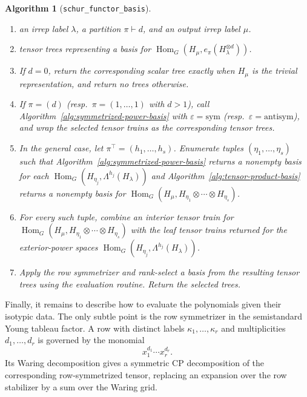 \documentclass[11pt]{article}
\newcommand{\HomG}[2]{\operatorname{Hom}_G\!\left(#1,#2\right)}
\newtheorem{algorithm}[theorem]{Algorithm}
\theoremstyle{definition}
\begin{document}
\begin{algorithm}[\texttt{schur\_functor\_basis}]\label{alg:schur-functor-basis}\label{alg:appendix-leaf-assembly}
  \phantom{}
  \begin{enumerate}[label=\textbf{Step \arabic*.},leftmargin=2.8cm]
    \item[\textbf{Input:}] an irrep label $\lambda$, a partition $\pi\vdash d$, and an output irrep label $\mu$.
    \item[\textbf{Output:}] tensor trees representing a basis for $\HomG{H_\mu}{e_\pi(H_\lambda^{\otimes d})}$.
    \item If $d=0$, return the corresponding scalar tree exactly when $H_\mu$ is the trivial representation, and return no trees otherwise.
    \item If $\pi=(d)$ (resp.~$\pi=(1,\dots,1)$ with $d>1$), call Algorithm~\ref{alg:symmetrized-power-basis} with $\varepsilon=\mathrm{sym}$ (resp.~$\varepsilon=\mathrm{antisym}$), and wrap the selected tensor trains as the corresponding tensor trees.
    \item In the general case, let $\pi^\top=(h_1,\dots,h_s)$.
    Enumerate tuples $(\eta_1,\dots,\eta_s)$ such that Algorithm~\ref{alg:symmetrized-power-basis} returns a nonempty basis for each $\HomG{H_{\eta_j}}{\Lambda^{h_j}(H_\lambda)}$ and Algorithm~\ref{alg:tensor-product-basis} returns a nonempty basis for $\HomG{H_\mu}{H_{\eta_1}\otimes\cdots\otimes H_{\eta_s}}$.
    \item For every such tuple, combine an interior tensor train for $\HomG{H_\mu}{H_{\eta_1}\otimes\cdots\otimes H_{\eta_s}}$ with the leaf tensor trains returned for the exterior-power spaces $\HomG{H_{\eta_j}}{\Lambda^{h_j}(H_\lambda)}$.
    \item Apply the row symmetrizer and rank-select a basis from the resulting tensor trees using the evaluation routine.
    Return the selected trees.
  \end{enumerate}
\end{algorithm}



Finally, it remains to describe how to evaluate the polynomials given their isotypic data.
The only subtle point is the row symmetrizer in the semistandard Young tableau factor.
A row with distinct labels $\kappa_1,\dots,\kappa_r$ and multiplicities $d_1,\dots,d_r$ is governed by the monomial
\[
  x_1^{d_1}\cdots x_r^{d_r}.
\]
Its Waring decomposition gives a symmetric CP decomposition of the corresponding row-symmetrized tensor, replacing an expansion over the row stabilizer by a sum over the Waring grid.
\end{document}
